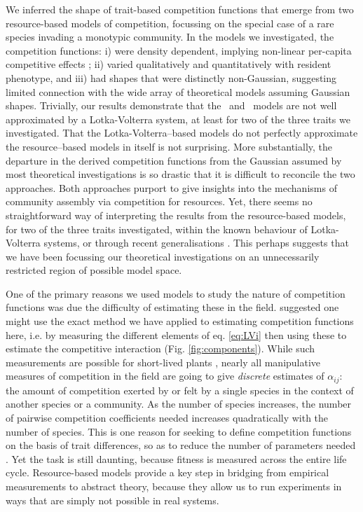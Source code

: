 \documentclass[a4paper,11pt]{article}
\begin{document}
We inferred the shape of trait-based competition functions that emerge from two resource-based models of competition, focussing on the special case of a rare species invading a monotypic community.
%
In the models we investigated, the competition functions: i) were density dependent, implying non-linear per-capita competitive effects \citep{Abrams-1980}; ii) varied qualitatively and quantitatively with resident phenotype, and iii) had shapes that were distinctly non-Gaussian, suggesting limited connection with the wide array of theoretical models assuming Gaussian shapes.
%
Trivially, our results demonstrate that the \Rstar\ and \plant\ models are not well approximated by a Lotka-Volterra system, at least for two of the three traits we investigated. That the Lotka-Volterra--based models do not perfectly approximate the resource--based models in itself is not surprising.
%
More substantially, the departure in the derived competition functions from the Gaussian assumed by most theoretical investigations is so drastic that it is difficult to reconcile the two approaches.
Both approaches purport to give insights into the mechanisms of community assembly via competition for resources.
Yet, there seems no straightforward way of interpreting the results from the resource-based models, for two of the three traits investigated, within the known behaviour of Lotka-Volterra systems, or through recent generalisations \citep{Leimar-2013}. This perhaps suggests that we have been focussing our theoretical investigations on an unnecessarily restricted region of possible model space.


One of the primary reasons we used models to study the nature of competition functions was due the difficulty of estimating these in the field. \citet{Ricklefs-1973} suggested one might use the exact method we have applied to estimating competition functions here, i.e. by measuring the different elements of eq. \ref{eq:LVi} then using these to estimate the competitive interaction (Fig. \ref{fig:components}).
While such measurements are possible for short-lived plants \citep{Kraft-2015}, nearly all manipulative measures of competition in the field are going to give \emph{discrete} estimates of $\alpha_{ij}$: the amount of competition exerted by or felt by a single species in the context of another species or a community. As the number of species increases, the number of pairwise competition coefficients needed increases quadratically with the number of species. This is one reason for seeking to define competition functions on the basis of trait differences, so as to reduce the number of parameters needed \citep{Kraft-2015}. 
Yet the task is still daunting, because fitness is measured across the entire life cycle.
Resource-based models provide a key step in bridging from empirical measurements to abstract theory, because they allow us to run experiments in ways that are simply not possible in real systems.
\end{document}
